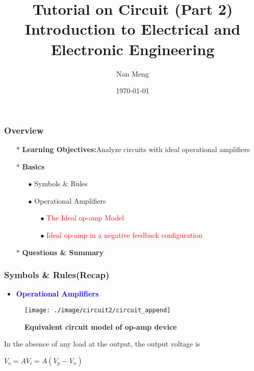 \documentclass{beamer}
\title[Circuit(ENGG 1203)]{Tutorial on Circuit (Part 2) \newline Introduction to Electrical and Electronic Engineering} %
\author{Nan Meng} %
\institute[Imaging Systems Laboratory] %
{
	University of Hong Kong \\ %
	\medskip
	\textit{u3003637@connect.hku.hk} %
}
\date{\today} %
\newcommand{\blue}[1]{\textcolor{blue}{#1}}
\newcommand{\red}[1]{\textcolor{red}{#1}}
\begin{document}
\begin{frame}
	\titlepage %
\end{frame}

\begin{frame}
\frametitle{Overview} %

\begin{itemize} \itemsep1pt \parskip0pt 
  \item[$\ast$] {\bf Learning Objectives:}\newline Analyze circuits with ideal operational amplifiers
  \item[$\ast$] {\bf Basics}
  \begin{itemize} \itemsep1pt \parskip0pt 
    \item[$\bullet$] Symbols \& Rules
    \item[$\bullet$] Operational Amplifiers
    \begin{itemize} \itemsep1pt \parskip0pt 
      \item[$\bullet$] \red{The Ideal op-amp Model}
      \item[$\bullet$] \red{Ideal op-amp in a negative feedback configuration}
    \end{itemize}
  \end{itemize}
  \item[$\ast$] {\bf Questions \& Summary}
\end{itemize}
\end{frame}




\begin{frame}
\frametitle{Symbols \& Rules(Recap)}

\begin{itemize}
  \item {\bf \blue{Operational Amplifiers}}
\end{itemize}
\begin{figure}[H]
  \centering
  \texttt{[image: ./image/circuit2/circuit\_append]}
  \caption{{\bf Equivalent circuit model of op-amp device}}
\end{figure}
\centerline{In the absence of any load at the output, the output voltage is }
\centerline{$V_o = AV_i = A(V_p - V_n)$}

\end{frame}
\end{document}
